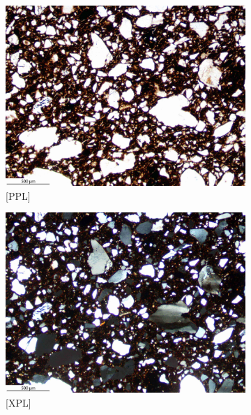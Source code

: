 \documentclass[a4paper]{article}
\begin{document}
\begin{figure}[H]
	\centering
	\begin{subfigure}[t]{.49\textwidth}
		\includegraphics[width=\textwidth]{ThinSections/56-1_4x_PPL.jpg}
		\caption{[PPL]}
	\end{subfigure}\hspace{.5em}\hfill
	\begin{subfigure}[t]{.49\textwidth}
		\includegraphics[width=\textwidth]{ThinSections/56-1_4x_XPL.jpg}
		\caption{[XPL]}
	\end{subfigure}
	\begin{subfigure}[t]{.49\textwidth}

\end{subfigure}
\end{figure}
\end{document}
